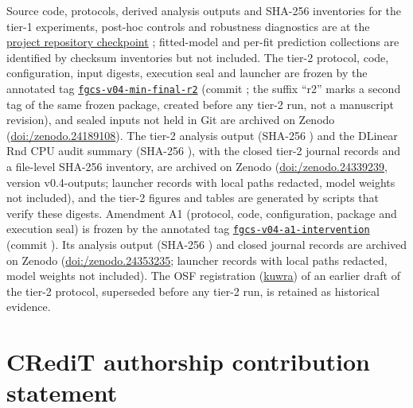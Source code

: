 \documentclass[5p,twocolumn]{elsarticle}
\begin{document}
Source code, protocols, derived analysis outputs and SHA-256 inventories for
the tier-1 experiments, post-hoc controls and robustness diagnostics are at
the
\href{https://github.com/KADOUMAAbdelhak/TimeTrack-Forecasting-Framework/tree/0e8cad884896a706f62f0fae4ab2b52812f9b033}{project repository checkpoint}
\texttt{}; fitted-model and
per-fit prediction collections are identified by checksum inventories but not
included. The tier-2 protocol, code, configuration, input digests, execution
seal and launcher are frozen by the annotated tag
\href{https://github.com/KADOUMAAbdelhak/TimeTrack-Forecasting-Framework/tree/fgcs-v04-min-final-r2}{\texttt{fgcs-v04-min-final-r2}}
(commit \texttt{}; the suffix
``r2'' marks a second tag of the same frozen package, created before any tier-2
run, not a manuscript revision), and sealed inputs not held in Git are archived on Zenodo
(\href{https://doi.org/10.5281/zenodo.24189108}{doi:/\allowbreak zenodo.24189108}).
The tier-2 analysis output (SHA-256
\texttt{})
and the DLinear Rnd CPU audit summary (SHA-256
\texttt{}),
with the closed tier-2 journal records and a file-level SHA-256 inventory, are
archived on Zenodo
(\href{https://doi.org/10.5281/zenodo.24339239}{doi:/\allowbreak zenodo.24339239},
version v0.4-outputs; launcher records with local paths redacted, model
weights not included), and the tier-2 figures and tables are generated by
scripts that verify these digests. Amendment A1 (protocol, code,
configuration, package and execution seal) is frozen by the annotated tag
\href{https://github.com/KADOUMAAbdelhak/TimeTrack-Forecasting-Framework/tree/fgcs-v04-a1-intervention}{\texttt{fgcs-v04-a1-intervention}}
(commit \texttt{}). Its
analysis output (SHA-256
\texttt{})
and closed journal records are archived on Zenodo
(\href{https://doi.org/10.5281/zenodo.24353235}{doi:/\allowbreak zenodo.24353235};
launcher records with local paths redacted, model weights not included).
The OSF registration (\href{https://osf.io/kuwra}{kuwra}) of an earlier draft
of the tier-2 protocol, superseded before any tier-2 run, is retained as
historical evidence.

\section*{CRediT authorship contribution statement}
\end{document}
